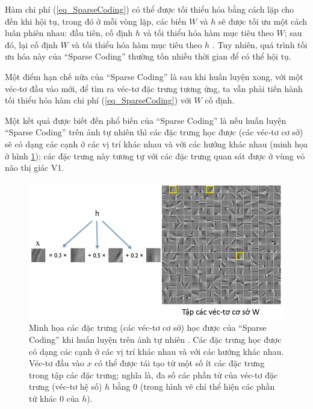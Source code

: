Hàm chi phí (\ref{eq_SparseCoding}) có thể được tối thiểu hóa bằng cách lặp cho đến khi hội tụ, trong đó ở mỗi vòng lặp, các biến $W$ và $h$ sẽ được tối ưu một cách luân phiên nhau: đầu tiên, cố định $h$ và tối thiểu hóa hàm mục tiêu theo $W$; sau đó, lại cố định $W$ và tối thiểu hóa hàm mục tiêu theo $h$ \cite{lee2006efficient}. Tuy nhiên, quá trình tối ưu hóa này của ``Sparse Coding'' thường tốn nhiều thời gian để có thể hội tụ.

Một điểm hạn chế nữa của ``Sparse Coding'' là sau khi huấn luyện xong, với một véc-tơ đầu vào mới, để tìm ra véc-tơ đặc trưng tương ứng, ta vẫn phải tiến hành tối thiểu hóa hàm chi phí (\ref{eq_SparseCoding}) với $W$ cố định.

Một kết quả được biết đến phổ biến của ``Sparse Coding'' là nếu huấn luyện ``Sparse Coding'' trên ảnh tự nhiên thì các đặc trưng học được (các véc-tơ cơ sở) sẽ có dạng các cạnh  ở các vị trí khác nhau và với các hướng khác nhau (minh họa ở hình \ref{fig_SparseCoding}); các đặc trưng này tương tự với các đặc trưng quan sát được ở vùng vỏ não thị giác V1. 

\begin{figure} 
	\centering
	\includegraphics[width=\textwidth]{SparseCoding}
	\caption[Minh họa các đặc trưng học được của ``Sparse Coding'' khi huấn luyện trên ảnh tự nhiên]{Minh họa các đặc trưng (các véc-tơ cơ sở) học được của ``Sparse Coding'' khi huấn luyện trên ảnh tự nhiên \cite{zeiler2014thesis}. Các đặc trưng học được có dạng các cạnh ở các vị trí khác nhau và với các hướng khác nhau. Véc-tơ đầu vào $x$ có thể được tái tạo từ một số ít các đặc trưng trong tập các đặc trưng; nghĩa là, đa số các phần tử của véc-tơ đặc trưng (véc-tơ hệ số) $h$ bằng 0 (trong hình vẽ chỉ thể hiện các phần tử khác 0 của $h$).}
	\label{fig_SparseCoding}
\end{figure}
